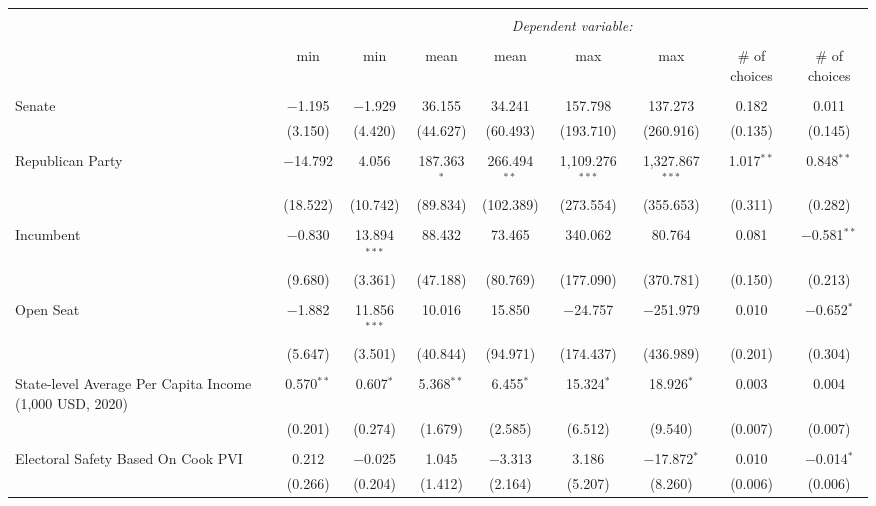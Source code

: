 
\begin{tabular}{@{\extracolsep{5pt}}lcccccccc} 
\\[-1.8ex]\hline 
\hline \\[-1.8ex] 
 & \multicolumn{8}{c}{\textit{Dependent variable:}} \\ 
\cline{2-9} 
\\[-1.8ex] & min & min & mean & mean & max & max & # of choices & # of choices \\ 
\hline \\[-1.8ex] 
 Senate & $-$1.195 & $-$1.929 & 36.155 & 34.241 & 157.798 & 137.273 & 0.182 & 0.011 \\ 
  & (3.150) & (4.420) & (44.627) & (60.493) & (193.710) & (260.916) & (0.135) & (0.145) \\ 
  & & & & & & & & \\ 
 Republican Party & $-$14.792 & 4.056 & 187.363$^{*}$ & 266.494$^{**}$ & 1,109.276$^{***}$ & 1,327.867$^{***}$ & 1.017$^{**}$ & 0.848$^{**}$ \\ 
  & (18.522) & (10.742) & (89.834) & (102.389) & (273.554) & (355.653) & (0.311) & (0.282) \\ 
  & & & & & & & & \\ 
 Incumbent & $-$0.830 & 13.894$^{***}$ & 88.432 & 73.465 & 340.062 & 80.764 & 0.081 & $-$0.581$^{**}$ \\ 
  & (9.680) & (3.361) & (47.188) & (80.769) & (177.090) & (370.781) & (0.150) & (0.213) \\ 
  & & & & & & & & \\ 
 Open Seat & $-$1.882 & 11.856$^{***}$ & 10.016 & 15.850 & $-$24.757 & $-$251.979 & 0.010 & $-$0.652$^{*}$ \\ 
  & (5.647) & (3.501) & (40.844) & (94.971) & (174.437) & (436.989) & (0.201) & (0.304) \\ 
  & & & & & & & & \\ 
 State-level Average Per Capita Income (1,000 USD, 2020) & 0.570$^{**}$ & 0.607$^{*}$ & 5.368$^{**}$ & 6.455$^{*}$ & 15.324$^{*}$ & 18.926$^{*}$ & 0.003 & 0.004 \\ 
  & (0.201) & (0.274) & (1.679) & (2.585) & (6.512) & (9.540) & (0.007) & (0.007) \\ 
  & & & & & & & & \\ 
 Electoral Safety Based On Cook PVI & 0.212 & $-$0.025 & 1.045 & $-$3.313 & 3.186 & $-$17.872$^{*}$ & 0.010 & $-$0.014$^{*}$ \\ 
  & (0.266) & (0.204) & (1.412) & (2.164) & (5.207) & (8.260) & (0.006) & (0.006) \\ 

\end{tabular}
